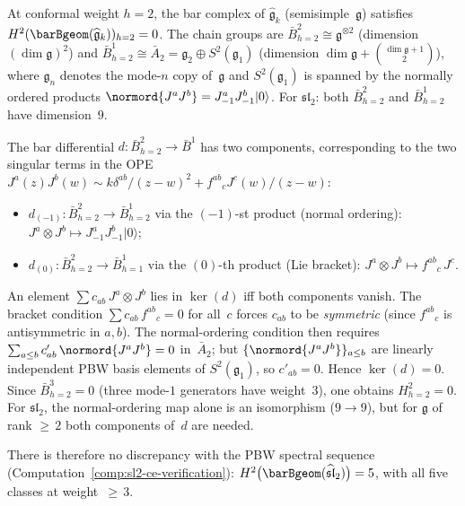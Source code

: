 \begin{lemma}\label{lem:bar-deg2-symmetric-square}
At conformal weight $h = 2$, the bar complex of
$\widehat{\mathfrak{g}}_k$ (semisimple~$\mathfrak{g}$) satisfies
$H^2(\barBgeom(\widehat{\mathfrak{g}}_k))_{h=2} = 0$.
The chain groups are $\bar{B}^2_{h=2} \cong \mathfrak{g}^{\otimes 2}$
(dimension~$(\dim\mathfrak{g})^2$) and
$\bar{B}^1_{h=2} \cong \bar{A}_2 = \mathfrak{g}_2 \oplus S^2(\mathfrak{g}_1)$
(dimension $\dim\mathfrak{g} + \binom{\dim\mathfrak{g}+1}{2}$),
where $\mathfrak{g}_n$ denotes the mode-$n$ copy of~$\mathfrak{g}$
and $S^2(\mathfrak{g}_1)$ is spanned by the normally ordered products
$\normord{J^a J^b} = J^a_{-1}J^b_{-1}|0\rangle$. For
$\mathfrak{sl}_2$: both $\bar{B}^2_{h=2}$ and $\bar{B}^1_{h=2}$
have dimension~$9$.

The bar differential $d \colon \bar{B}^2_{h=2} \to \bar{B}^1$
has two components, corresponding to the two singular terms in the
OPE $J^a(z)J^b(w) \sim k\delta^{ab}/(z-w)^2 + f^{ab}{}_c
J^c(w)/(z-w)$:
\begin{itemize}
\item $d_{(-1)} \colon \bar{B}^2_{h=2} \to \bar{B}^1_{h=2}$
 via the $(-1)$-st product (normal ordering):
 $J^a \otimes J^b \mapsto J^a_{-1}J^b_{-1}|0\rangle$;

\item $d_{(0)} \colon \bar{B}^2_{h=2} \to \bar{B}^1_{h=1}$
 via the $(0)$-th product (Lie bracket):
 $J^a \otimes J^b \mapsto f^{ab}{}_c\, J^c$.
\end{itemize}

An element $\sum c_{ab}\, J^a \otimes J^b$ lies in $\ker(d)$ iff
both components vanish. The bracket condition
$\sum c_{ab}\, f^{ab}{}_c = 0$ for all~$c$ forces $c_{ab}$
to be \emph{symmetric} (since $f^{ab}{}_c$ is antisymmetric in
$a,b$). The normal-ordering condition then requires
$\sum_{a \leq b} c'_{ab}\, \normord{J^a J^b} = 0$
in~$\bar{A}_2$; but $\{\normord{J^a J^b}\}_{a \leq b}$ are
linearly independent PBW basis elements of
$S^2(\mathfrak{g}_1)$, so $c'_{ab} = 0$.
Hence $\ker(d) = 0$. Since $\bar{B}^3_{h=2} = 0$ (three
mode-$1$ generators have weight~$3$), one obtains $H^2_{h=2} = 0$.
For $\mathfrak{sl}_2$, the normal-ordering map alone is an
isomorphism ($9 \to 9$), but for $\mathfrak{g}$ of rank
${\geq}\, 2$ both components of~$d$ are needed.

There is therefore no discrepancy with the PBW spectral sequence
(Computation~\ref{comp:sl2-ce-verification}):
$H^2\bigl(\barBgeom(\widehat{\mathfrak{sl}}_2)\bigr) = 5$,
with all five classes at weight~${\geq}\, 3$.
\end{lemma}

